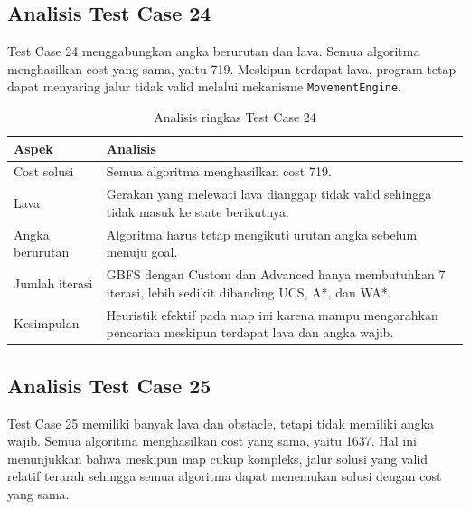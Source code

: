 \subsection{Analisis Test Case 24}

Test Case 24 menggabungkan angka berurutan dan lava. 
Semua algoritma menghasilkan cost yang sama, yaitu 719. 
Meskipun terdapat lava, program tetap dapat menyaring jalur tidak valid melalui mekanisme \texttt{MovementEngine}.

\begin{table}[H]
	\centering
	\caption{Analisis ringkas Test Case 24}
	\begin{tabular}{|p{4cm}|p{10cm}|}
		\hline
		\rowcolor{blue!15}
		\textbf{Aspek} & \textbf{Analisis} \\
		\hline
		Cost solusi & Semua algoritma menghasilkan cost 719. \\
		\hline
		Lava & Gerakan yang melewati lava dianggap tidak valid sehingga tidak masuk ke state berikutnya. \\
		\hline
		Angka berurutan & Algoritma harus tetap mengikuti urutan angka sebelum menuju goal. \\
		\hline
		Jumlah iterasi & GBFS dengan Custom dan Advanced hanya membutuhkan 7 iterasi, lebih sedikit dibanding UCS, A*, dan WA*. \\
		\hline
		Kesimpulan & Heuristik efektif pada map ini karena mampu mengarahkan pencarian meskipun terdapat lava dan angka wajib. \\
		\hline
	\end{tabular}
\end{table}

\subsection{Analisis Test Case 25}

Test Case 25 memiliki banyak lava dan obstacle, tetapi tidak memiliki angka wajib. 
Semua algoritma menghasilkan cost yang sama, yaitu 1637. 
Hal ini menunjukkan bahwa meskipun map cukup kompleks, jalur solusi yang valid relatif terarah sehingga semua algoritma dapat menemukan solusi dengan cost yang sama.


